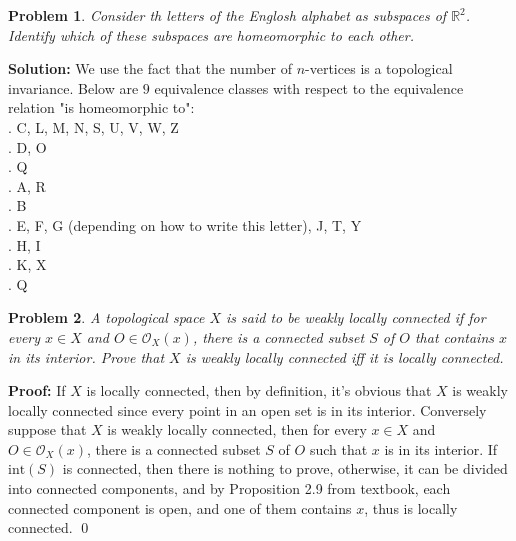 \documentclass[12pt]{article}
\newtheorem{problem}{Problem}
\begin{document}
\begin{problem}
Consider th letters of the Englosh alphabet as subspaces of $\mathbb{R}^2$. Identify which of these subspaces are homeomorphic to each other. 
\end{problem}

\textbf{Solution:} We use the fact that the number of $n$-vertices is a topological invariance. Below are $9$ equivalence classes with respect to the equivalence relation "is homeomorphic to": \\
. C, L, M, N, S, U, V, W, Z \\
. D, O\\
. Q \\
. A, R \\
. B \\
. E, F, G (depending on how to write this letter), J, T, Y\\
. H, I \\
. K, X\\
. Q
\\
\begin{problem}
A topological space $X$ is said to be weakly locally connected if for every $x\in X$ and $O\in\mathcal{O}_X(x)$, there is a connected subset $S$ of $O$ that contains $x$ in its interior. Prove that $X$ is weakly locally connected iff it is locally connected.
\end{problem}

\textbf{Proof:} If $X$ is locally connected, then by definition, it's obvious that $X$ is weakly locally connected since every point in an open set is in its interior. Conversely suppose that $X$ is weakly locally connected, then for every $x\in X$ and $O\in\mathcal{O}_X(x)$, there is a connected subset $S$ of $O$ such that $x$ is in its interior. If $\text{int}(S)$ is connected, then there is nothing to prove, otherwise, it can be divided into connected components, and by Proposition 2.9 from textbook, each connected component is open, and one of them contains $x$, thus is locally connected. \qed
\end{document}
